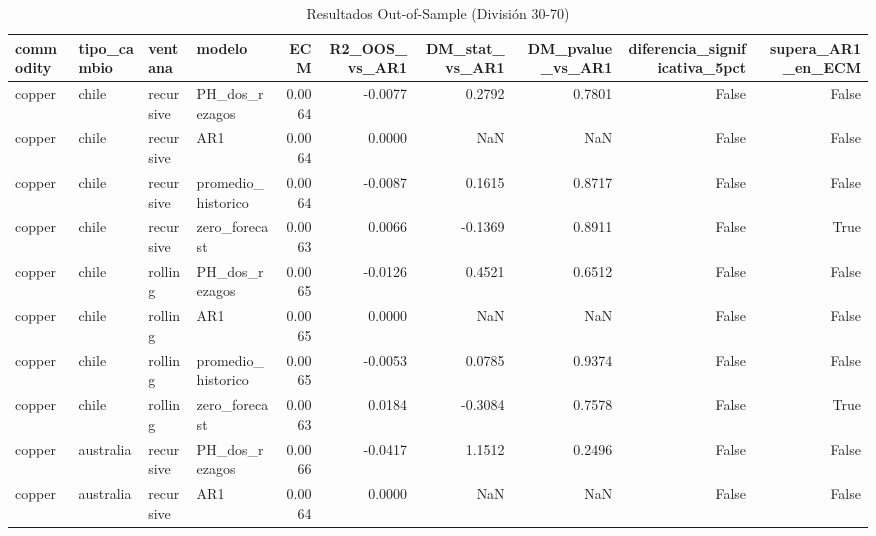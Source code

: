 \begin{table}
\caption{Resultados Out-of-Sample (División 30-70)}
\label{tab:oos_30}
\begin{tabular}{llllrrrrrr}
\toprule
commodity & tipo_cambio & ventana & modelo & ECM & R2_OOS_vs_AR1 & DM_stat_vs_AR1 & DM_pvalue_vs_AR1 & diferencia_significativa_5pct & supera_AR1_en_ECM \\
\midrule
copper & chile & recursive & PH_dos_rezagos & 0.0064 & -0.0077 & 0.2792 & 0.7801 & False & False \\
copper & chile & recursive & AR1 & 0.0064 & 0.0000 & NaN & NaN & False & False \\
copper & chile & recursive & promedio_historico & 0.0064 & -0.0087 & 0.1615 & 0.8717 & False & False \\
copper & chile & recursive & zero_forecast & 0.0063 & 0.0066 & -0.1369 & 0.8911 & False & True \\
copper & chile & rolling & PH_dos_rezagos & 0.0065 & -0.0126 & 0.4521 & 0.6512 & False & False \\
copper & chile & rolling & AR1 & 0.0065 & 0.0000 & NaN & NaN & False & False \\
copper & chile & rolling & promedio_historico & 0.0065 & -0.0053 & 0.0785 & 0.9374 & False & False \\
copper & chile & rolling & zero_forecast & 0.0063 & 0.0184 & -0.3084 & 0.7578 & False & True \\
copper & australia & recursive & PH_dos_rezagos & 0.0066 & -0.0417 & 1.1512 & 0.2496 & False & False \\
copper & australia & recursive & AR1 & 0.0064 & 0.0000 & NaN & NaN & False & False \\
\bottomrule
\end{tabular}
\end{table}
